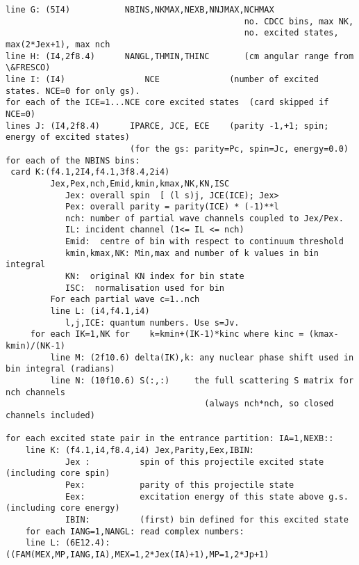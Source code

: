 \documentclass[11pt]{article}
\begin{document}
\begin{description}
{\begin{verbatim}
line G: (5I4)           NBINS,NKMAX,NEXB,NNJMAX,NCHMAX
                                                no. CDCC bins, max NK,
                                                no. excited states, max(2*Jex+1), max nch
line H: (I4,2f8.4)      NANGL,THMIN,THINC       (cm angular range from \&FRESCO)
line I: (I4)                NCE              (number of excited states. NCE=0 for only gs).
for each of the ICE=1...NCE core excited states  (card skipped if NCE=0)
lines J: (I4,2f8.4)      IPARCE, JCE, ECE    (parity -1,+1; spin; energy of excited states)
                         (for the gs: parity=Pc, spin=Jc, energy=0.0)
for each of the NBINS bins:
 card K:(f4.1,2I4,f4.1,3f8.4,2i4)
         Jex,Pex,nch,Emid,kmin,kmax,NK,KN,ISC
            Jex: overall spin  [ (l s)j, JCE(ICE); Jex>
            Pex: overall parity = parity(ICE) * (-1)**l
            nch: number of partial wave channels coupled to Jex/Pex.
            IL: incident channel (1<= IL <= nch)
            Emid:  centre of bin with respect to continuum threshold
            kmin,kmax,NK: Min,max and number of k values in bin integral
            KN:  original KN index for bin state
            ISC:  normalisation used for bin
         For each partial wave c=1..nch
         line L: (i4,f4.1,i4)
            l,j,ICE: quantum numbers. Use s=Jv.            
     for each IK=1,NK for    k=kmin+(IK-1)*kinc where kinc = (kmax-kmin)/(NK-1)
         line M: (2f10.6) delta(IK),k: any nuclear phase shift used in bin integral (radians)
         line N: (10f10.6) S(:,:)     the full scattering S matrix for nch channels 
                                        (always nch*nch, so closed channels included)

for each excited state pair in the entrance partition: IA=1,NEXB::
    line K: (f4.1,i4,f8.4,i4) Jex,Parity,Eex,IBIN:
            Jex :          spin of this projectile excited state (including core spin)
            Pex:           parity of this projectile state
            Eex:           excitation energy of this state above g.s. (including core energy)
            IBIN:          (first) bin defined for this excited state
    for each IANG=1,NANGL: read complex numbers:
    line L: (6E12.4): ((FAM(MEX,MP,IANG,IA),MEX=1,2*Jex(IA)+1),MP=1,2*Jp+1)
\end{verbatim}
}




\end{description}
\end{document}
